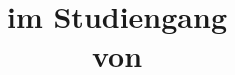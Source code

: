 
\begin{titlepage}

\title{
	\vspace{-1cm}
	\Large{\documentinstitute}
	\vspace{1cm}
	\huge{%
		\textbf{\documenttitle}%
	}
	\vspace{2cm}\\
	\Large{\documenttype}
	\vspace{1cm}\\
	\textnormal{im Studiengang \documentcourse}
	\vspace{0.6cm}\\
	\textnormal{von}
	\vspace{0.6cm}\\
	\textbf{\documentauthor}
	\vspace{1.9cm}\\
	\documenttutor
	\vspace{-1cm}
	\date{\documentdate}
}

\end{titlepage}